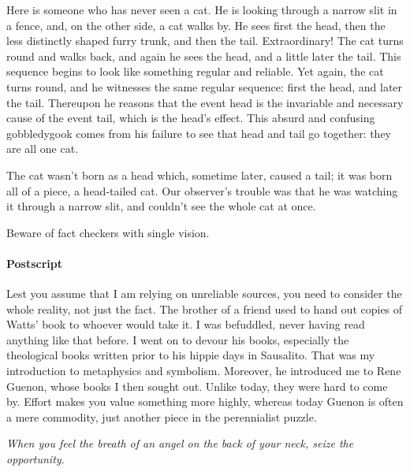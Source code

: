 \begin{quotationx}
Here is someone who has never seen a cat. He is looking through a narrow slit in a fence, and, on the other side, a cat walks by. He sees first the head, then the less distinctly shaped furry trunk, and then the tail. Extraordinary! The cat turns round and walks back, and again he sees the head, and a little later the tail. This sequence begins to look like something regular and reliable. Yet again, the cat turns round, and he witnesses the same regular sequence: first the head, and later the tail. Thereupon he reasons that the event head is the invariable and necessary cause of the event tail, which is the head's effect. This absurd and confusing gobbledygook comes from his failure to see that head and tail go together: they are all one cat.

The cat wasn't born as a head which, sometime later, caused a tail; it was born all of a piece, a head-tailed cat. Our observer's trouble was that he was watching it through a narrow slit, and couldn't see the whole cat at once.
\end{quotationx}


Beware of fact checkers with single vision.

\paragraph{Postscript}


Lest you assume that I am relying on unreliable sources, you need to consider the whole reality, not just the fact. The brother of a friend used to hand out copies of Watts' book to whoever would take it. I was befuddled, never having read anything like that before. I went on to devour his books, especially the theological books written prior to his hippie days in Sausalito. That was my introduction to metaphysics and symbolism. Moreover, he introduced me to Rene Guenon, whose books I then sought out. Unlike today, they were hard to come by. Effort makes you value something more highly, whereas today Guenon is often a mere commodity, just another piece in the perennialist puzzle.

\emph{When you feel the breath of an angel on the back of your neck, seize the opportunity.}



